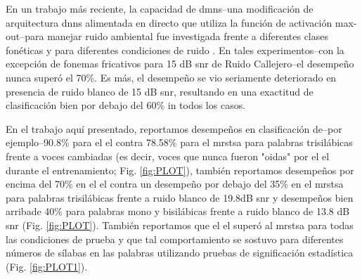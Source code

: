 En un trabajo más reciente, la capacidad de \glspl{dmn}--una modificación de arquitectura \glspl{dnn} alimentada en directo que utiliza la función de activación max-out--para manejar ruido ambiental fue investigada frente a diferentes clases fonéticas y para diferentes condiciones de ruido \cite{silos_2016}. En tales experimentos--con la excepción de fonemas fricativos para 15 dB \gls{snr} de Ruido Callejero--el desempeño nunca superó el 70\%. Es más, el desempeño se vio seriamente deteriorado en presencia de ruido blanco de 15 dB \gls{snr}, resultando en una exactitud de clasificación bien por debajo del 60\% in todos los casos.

En el trabajo aquí presentado, reportamos desempeños en clasificación de--por ejemplo--90.8\% para el \gls{el} contra 78.58\% para el \gls{mrstsa} para palabras trisilábicas frente a voces cambiadas (es decir, voces que nunca fueron "oidas" por el \gls{el} durante el entrenamiento; Fig. \ref{fig:PLOT}), también reportamos desempeños por encima del 70\% en el \gls{el} contra un desempeño por debajo del 35\% en el \gls{mrstsa} para palabras trisilábicas frente a ruido blanco de 19.8dB \gls{snr} y desempeños bien arribade 40\% para palabras mono y bisilábicas frente a ruido blanco de 13.8 dB \gls{snr} (Fig. \ref{fig:PLOT}). También reportamos que el \gls{el} superó al \gls{mrstsa} para todas las condiciones de prueba y que tal comportamiento se sostuvo para diferentes números de sílabas en las palabras utilizando pruebas de significación estadística (Fig. \ref{fig:PLOT1}).

